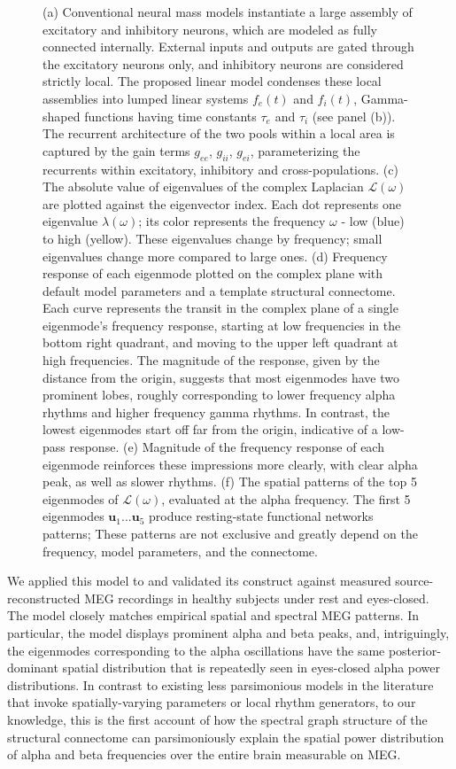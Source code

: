 \begin{figure}[htbp]
    \caption*{(a) Conventional neural mass models instantiate a large assembly of excitatory and inhibitory neurons, which are modeled as fully connected internally. External inputs and outputs are gated through the excitatory neurons only, and inhibitory neurons are considered strictly local. The proposed linear model condenses these local assemblies into lumped linear systems $f_{e}(t)$ and $f_{i}(t)$, Gamma-shaped functions having time constants $\tau_e$ and $\tau_i$ (see panel (b)). The recurrent architecture of the two pools within a local area is captured by the gain terms $g_{ee}$, $g_{ii}$, $g_{ei}$, parameterizing the recurrents within excitatory, inhibitory and cross-populations. (c) The absolute value of eigenvalues of the complex Laplacian $\bm{\mathcal{L}}(\omega)$ are plotted against the eigenvector index. Each dot represents one eigenvalue  $\lambda(\omega)$; its color represents the frequency $\omega$ - low (blue) to high (yellow). These eigenvalues change by frequency; small eigenvalues change more compared to large ones. (d) Frequency response of each eigenmode plotted on the complex plane with default model parameters and a template structural connectome. Each curve represents the transit in the complex plane of a single eigenmode's frequency response, starting at low frequencies in the bottom right quadrant, and moving to the upper left quadrant at high frequencies. The magnitude of the response, given by the distance from the origin, suggests that most eigenmodes have two prominent lobes, roughly corresponding to lower frequency alpha rhythms and higher frequency gamma rhythms. In contrast, the lowest eigenmodes start off far from the origin, indicative of a low-pass response. (e) Magnitude of the frequency response of each eigenmode reinforces these impressions more clearly, with clear alpha peak, as well as slower rhythms. (f) The spatial patterns of the top 5 eigenmodes of $\bm{\mathcal{L}}(\omega)$, evaluated at the alpha frequency. The first 5 eigenmodes $\bm{u}_1 ... \bm{u}_5$ produce resting-state functional networks patterns; These patterns are not exclusive and greatly depend on the frequency,  model parameters, and the connectome.}
    \label{fig:sgmodel}
\end{figure}

We applied this model to and validated its construct against measured
source-reconstructed MEG recordings in healthy subjects under rest and
eyes-closed. The model closely matches empirical spatial and spectral
MEG patterns. In particular, the model displays prominent alpha and beta
peaks, and, intriguingly, the eigenmodes corresponding to the alpha
oscillations have the same posterior-dominant spatial distribution that
is repeatedly seen in eyes-closed alpha power distributions. In contrast
to existing less parsimonious models in the literature that invoke
spatially-varying parameters or local rhythm generators, to our
knowledge, this is the first account of how the spectral graph structure
of the structural connectome can parsimoniously explain the spatial
power distribution of alpha and beta frequencies over the entire brain
measurable on MEG.

